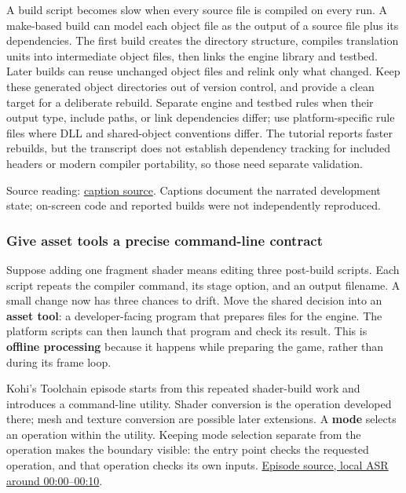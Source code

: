 A build script becomes slow when every source file is compiled on every run. A make-based build can model each object file as the output of a source file plus its dependencies. The first build creates the directory structure, compiles translation units into intermediate object files, then links the engine library and testbed. Later builds can reuse unchanged object files and relink only what changed. Keep these generated object directories out of version control, and provide a clean target for a deliberate rebuild. Separate engine and testbed rules when their output type, include paths, or link dependencies differ; use platform-specific rule files where DLL and shared-object conventions differ. The tutorial reports faster rebuilds, but the transcript does not establish dependency tracking for included headers or modern compiler portability, so those need separate validation.

Source reading: \href{https://www.youtube.com/watch?v=WR0tAQj-og8}{caption source}. Captions document the narrated development state; on-screen code and reported builds were not independently reproduced.

\subsubsection{Give asset tools a precise command-line contract}\label{05-engine-i-ch013-give-asset-tools-a-precise-command-line-contract}

\hypertarget{05-engine-i-ch013-give-asset-tools-a-precise-command-line-contract}{}

Suppose adding one fragment shader means editing three post-build scripts. Each script repeats the compiler command, its stage option, and an output filename. A small change now has three chances to drift. Move the shared decision into an \textbf{asset tool}: a developer-facing program that prepares files for the engine. The platform scripts can then launch that program and check its result. This is \textbf{offline processing} because it happens while preparing the game, rather than during its frame loop.

Kohi's Toolchain episode starts from this repeated shader-build work and introduces a command-line utility. Shader conversion is the operation developed there; mesh and texture conversion are possible later extensions. A \textbf{mode} selects an operation within the utility. Keeping mode selection separate from the operation makes the boundary visible: the entry point checks the requested operation, and that operation checks its own inputs. \href{https://www.youtube.com/watch?v=cCEmwjfHIkY&t=0}{Episode source, local ASR around 00:00--00:10}.

